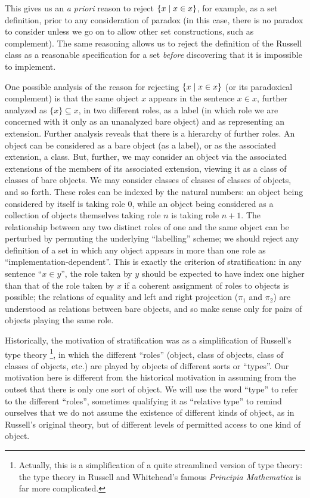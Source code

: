 This gives us an {\itshape a priori\/} reason to reject $\{x \mid x \in
x\}$, for example, as a set definition, prior to any consideration of
paradox (in this case, there is no paradox to consider unless
we go on to allow other set constructions, such as
complement).  The same
reasoning allows us to reject the definition of the Russell class as a
reasonable specification for a set {\itshape before\/} discovering that it
is impossible to implement.

One possible analysis of the reason for rejecting $\{x \mid x \in x\}$
(or its paradoxical complement) is that the same object $x$
appears in the sentence $x \in x$, further analyzed as $\{x\} \subseteq x$, in
two different roles, as a label (in which role we are concerned with
it only as an unanalyzed bare object) and as representing an
extension.  Further analysis reveals that there is a hierarchy of
further roles.  An object can be considered as a bare object (as a
label), or as the associated extension, a class.  But, further, we may
consider an object via the associated extensions of the members of its
associated extension, viewing it as a class of classes of bare
objects.  We may consider classes of classes of classes of objects,
and so forth.  These roles can be indexed by the natural
numbers: an object being considered by itself is taking role 0, while an object
being considered as a collection of objects themselves taking role $n$
is taking role $n+1$.  The relationship between any two distinct roles
of one and the same object can be perturbed by permuting the
underlying ``labelling'' scheme; we should reject any definition of a
set in which any object appears in more than one role as
``implementation-dependent''.  This is exactly the criterion of
stratification: in any sentence ``$x \in y$'', the role
taken by $y$ should be expected to have index one higher than that of the role
taken by $x$ if a coherent assignment of roles to objects is possible;
the relations of equality and left and right projection ($\pi_1$ and
$\pi_2$) are understood as relations between bare objects, and so make
sense only for pairs of objects playing the same role.

Historically, the motivation of stratification was as a simplification
of Russell's type theory \footnote{Actually, this is a simplification of a quite streamlined version of type theory:  the type theory in Russell and Whitehead's famous {\em Principia Mathematica\/} is far more complicated.}, in which the different
``roles'' (object, class of objects, class of classes of objects, etc.) are
played by objects of different sorts or ``types''.  Our motivation here is
different from the historical motivation in assuming from the outset
that there is only one sort of object.  We will use the word ``type''
to refer to the different ``roles'', sometimes qualifying it as
``relative type'' to remind ourselves that we do not
assume the existence of different kinds of object, as in Russell's original
theory, but of different levels of permitted access to one kind of
object.

